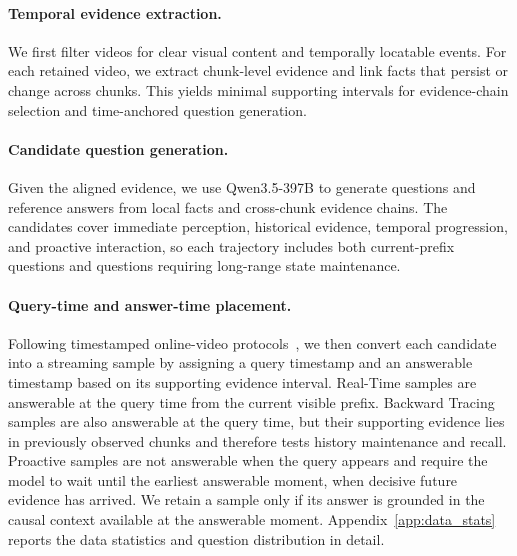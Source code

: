 \paragraph{Temporal evidence extraction.}
We first filter videos for clear visual content and temporally locatable events.
For each retained video, we extract chunk-level evidence and link facts that persist or change across chunks.
This yields minimal supporting intervals for evidence-chain selection and time-anchored question generation.

\paragraph{Candidate question generation.}
Given the aligned evidence, we use Qwen3.5-397B to generate questions and reference answers from local facts and cross-chunk evidence chains.
The candidates cover immediate perception, historical evidence, temporal progression, and proactive interaction, so each trajectory includes both current-prefix questions and questions requiring long-range state maintenance.

\paragraph{Query-time and answer-time placement.}
Following timestamped online-video protocols~\citep{ovobench2025,svbench2025,streambridge2025}, we then convert each candidate into a streaming sample by assigning a query timestamp and an answerable timestamp based on its supporting evidence interval.
Real-Time samples are answerable at the query time from the current visible prefix.
Backward Tracing samples are also answerable at the query time, but their supporting evidence lies in previously observed chunks and therefore tests history maintenance and recall.
Proactive samples are not answerable when the query appears and require the model to wait until the earliest answerable moment, when decisive future evidence has arrived.
We retain a sample only if its answer is grounded in the causal context available at the answerable moment.
Appendix~\ref{app:data_stats} reports the data statistics and question distribution in detail.
